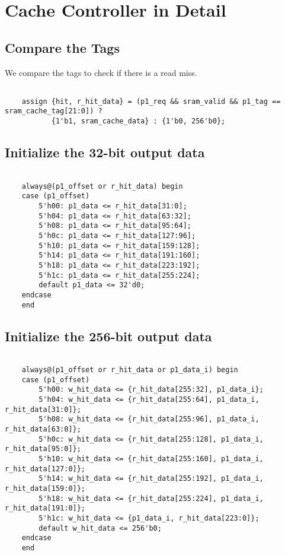 \documentclass{article}
\begin{document}
\section{Cache Controller in Detail}
\subsection*{Compare the Tags}
    We compare the tags to check if there is a read miss.


\lstset{language = Verilog}          %

\begin{lstlisting}[frame=single]  % Start your code-block

    assign {hit, r_hit_data} = (p1_req && sram_valid && p1_tag == sram_cache_tag[21:0]) ?
           {1'b1, sram_cache_data} : {1'b0, 256'b0};

\end{lstlisting}

\subsection*{Initialize the 32-bit output data}
\begin{lstlisting}[frame=single]  % Start your code-block

    always@(p1_offset or r_hit_data) begin 
    case (p1_offset)
        5'h00: p1_data <= r_hit_data[31:0];
        5'h04: p1_data <= r_hit_data[63:32];
        5'h08: p1_data <= r_hit_data[95:64];
        5'h0c: p1_data <= r_hit_data[127:96];
        5'h10: p1_data <= r_hit_data[159:128];
        5'h14: p1_data <= r_hit_data[191:160];
        5'h18: p1_data <= r_hit_data[223:192];
        5'h1c: p1_data <= r_hit_data[255:224];
        default p1_data <= 32'd0;
    endcase
    end
\end{lstlisting}

\subsection*{Initialize the 256-bit output data}

\begin{lstlisting}[frame=single]  % Start your code-block

    always@(p1_offset or r_hit_data or p1_data_i) begin
    case (p1_offset)
        5'h00: w_hit_data <= {r_hit_data[255:32], p1_data_i};
        5'h04: w_hit_data <= {r_hit_data[255:64], p1_data_i, r_hit_data[31:0]};
        5'h08: w_hit_data <= {r_hit_data[255:96], p1_data_i, r_hit_data[63:0]};
        5'h0c: w_hit_data <= {r_hit_data[255:128], p1_data_i, r_hit_data[95:0]};
        5'h10: w_hit_data <= {r_hit_data[255:160], p1_data_i, r_hit_data[127:0]};
        5'h14: w_hit_data <= {r_hit_data[255:192], p1_data_i, r_hit_data[159:0]};
        5'h18: w_hit_data <= {r_hit_data[255:224], p1_data_i, r_hit_data[191:0]};
        5'h1c: w_hit_data <= {p1_data_i, r_hit_data[223:0]};
        default w_hit_data <= 256'b0;
    endcase
    end
\end{lstlisting}
\end{document}
